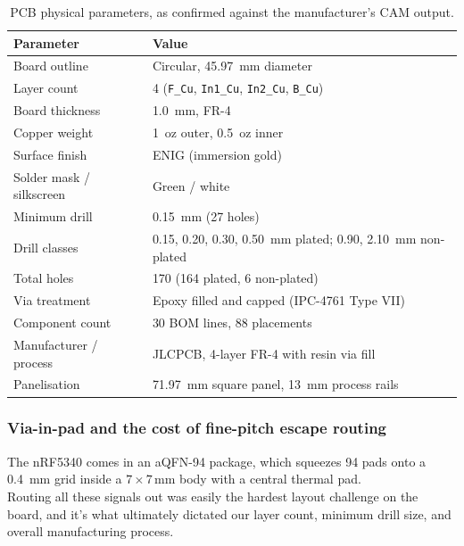 \documentclass[12pt, a4paper]{article}
\begin{document}
\begin{table}[H]
\centering
\small
\begin{tabular}{@{}l l@{}}
\toprule
\textbf{Parameter} & \textbf{Value} \\
\midrule
Board outline & Circular, \SI{45.97}{\milli\metre} diameter \\
Layer count & 4 (\texttt{F\_Cu}, \texttt{In1\_Cu}, \texttt{In2\_Cu}, \texttt{B\_Cu}) \\
Board thickness & \SI{1.0}{\milli\metre}, FR-4 \\
Copper weight & \SI{1}{oz} outer, \SI{0.5}{oz} inner \\
Surface finish & ENIG (immersion gold) \\
Solder mask / silkscreen & Green / white \\
Minimum drill & \SI{0.15}{\milli\metre} (27 holes) \\
Drill classes & 0.15, 0.20, 0.30, \SI{0.50}{\milli\metre} plated; 0.90, \SI{2.10}{\milli\metre} non-plated \\
Total holes & 170 (164 plated, 6 non-plated) \\
Via treatment & Epoxy filled and capped (IPC-4761 Type VII) \\
Component count & 30 BOM lines, 88 placements \\
Manufacturer / process & JLCPCB, 4-layer FR-4 with resin via fill \\
Panelisation & \SI{71.97}{\milli\metre} square panel, \SI{13}{\milli\metre} process rails \\
\bottomrule
\end{tabular}
\caption{PCB physical parameters, as confirmed against the manufacturer's CAM output.}
\label{tab:pcb}
\end{table}

\subsubsection{Via-in-pad and the cost of fine-pitch escape routing}
\label{impl:viainpad}

The nRF5340 comes in an aQFN-94 package, which squeezes 94 pads onto a \SI{0.4}{\milli\metre} grid inside a $7\times7\,\text{mm}$ body with a central thermal pad. \\
Routing all these signals out was easily the hardest layout challenge on the board, and it's what ultimately dictated our layer count, minimum drill size, and overall manufacturing process.
\end{document}
